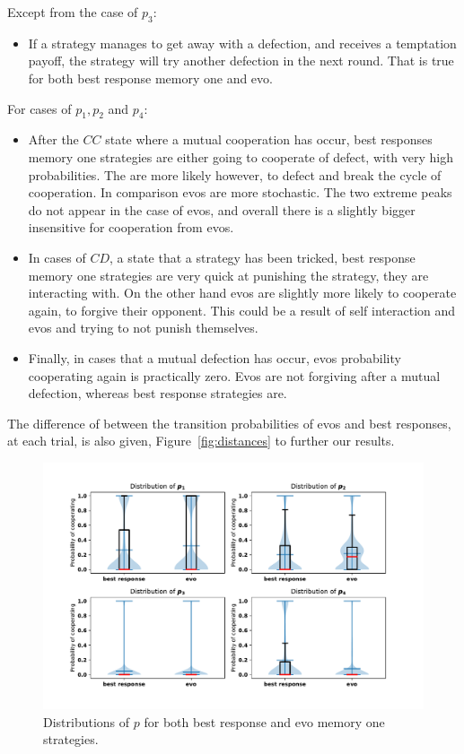 \documentclass[10pt]{article}
\begin{document}
Except from the case of \(p_3\):

\begin{itemize}
    \item If a
    strategy manages to get away with a defection, and receives a temptation payoff,
    the strategy will try another defection in the next round.  That is true for
    both best response memory one and evo.
\end{itemize}

For cases of \(p_1, p_2\) and \(p_4\):

\begin{itemize}
    \item After the \(CC\) state where a mutual cooperation has occur, best
    responses memory one strategies are either going to cooperate of defect,
    with very high probabilities. The are more likely however, to defect and
    break the cycle of cooperation. In comparison evos are more stochastic. The
    two extreme peaks do not appear in the case of evos, and overall there is a
    slightly bigger insensitive for cooperation from evos.
    \item In cases of \(CD\), a state that a strategy has been tricked, best
    response memory one strategies are very quick at punishing the strategy,
    they are interacting with. On the other hand evos are slightly more likely
    to cooperate again, to forgive their opponent. This could be a result of
    self interaction and evos and trying to not punish themselves.
    \item Finally, in cases that a mutual defection has occur, evos probability
    cooperating again is practically zero. Evos are not forgiving after a mutual
    defection, whereas best response strategies are.
\end{itemize}

The difference of between the transition probabilities of evos and best responses,
at each trial, is also given, Figure~\ref{fig:distances} to further our results.

\begin{figure}
    \centering
    \includegraphics[width=.8\textwidth]{img/behaviour_violin_plots.pdf}
    \caption{Distributions of \(p\) for both best response and evo memory one
    strategies.}
    \label{fig:behaviour_violin_plots}
\end{figure}
\end{document}
